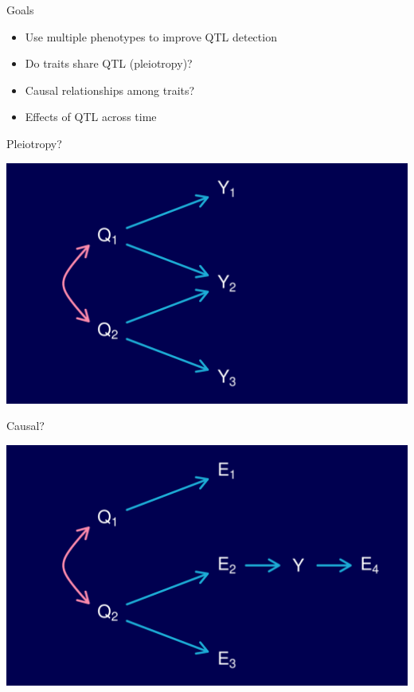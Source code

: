 \documentclass[12pt]{article}
\newcommand{\headsize}{\fontsize{35}{35} \selectfont}
\newcommand{\smallsize}{\fontsize{25}{30} \selectfont}
\begin{document}
\newpage

\headsize \color{myyellow}
\hfill \begin{minipage}{5.75in}
\centering
Goals
\end{minipage}

\vspace{30mm}

\color{mywhite} \smallsize

\hspace*{0.5in}
\begin{minipage}[t]{9.5in}
  \begin{itemize}
    \itemsep18pt
  \item Use multiple phenotypes to improve QTL detection
  \item Do traits share QTL (pleiotropy)?
  \item Causal relationships among traits?
  \item Effects of QTL across time
  \end{itemize}
\end{minipage}



\newpage

\headsize \color{myyellow}
\hfill \begin{minipage}{5.75in}
\centering
Pleiotropy?
\end{minipage}

\vspace{20mm}

\centerline{\includegraphics{Figs/pleiotropy_network.pdf}}


\newpage

\headsize \color{myyellow}
\hfill \begin{minipage}{5.75in}
\centering
Causal?
\end{minipage}

\vspace{22.3mm}

\centerline{\includegraphics{Figs/causal_network.pdf}}
\end{document}
